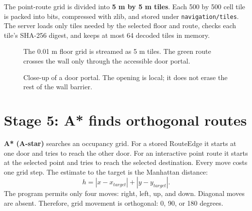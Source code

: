 \documentclass[11pt,a4paper]{article}
\newcommand{\term}[1]{\textbf{#1}}
\newcommand{\code}[1]{\texttt{#1}}
\newcommand{\door}[2]{\fill[green] (#1-0.16,#2-0.32) rectangle (#1+0.16,#2+0.32);}
\begin{document}
The point-route grid is divided into \term{5 m by 5 m tiles}. Each 500 by 500 cell tile is packed into bits, compressed with zlib, and stored under \code{navigation/tiles}. The server loads only tiles needed by the selected floor and route, checks each tile's SHA-256 digest, and keeps at most 64 decoded tiles in memory.

\begin{figure}[H]\centering
{}
\caption{The 0.01 m floor grid is streamed as 5 m tiles. The green route crosses the wall only through the accessible door portal.}
\end{figure}

\begin{figure}[H]\centering
{}
\caption{Close-up of a door portal. The opening is local; it does not erase the rest of the wall barrier.}
\end{figure}

\section{Stage 5: A* finds orthogonal routes}
\term{A* (A-star)} searches an occupancy grid. For a stored RouteEdge it starts at one door and tries to reach the other door. For an interactive point route it starts at the selected point and tries to reach the selected destination. Every move costs one grid step. The estimate to the target is the Manhattan distance:
\[
 h = |x-x_{target}| + |y-y_{target}|.
\]
The program permits only four moves: right, left, up, and down. Diagonal moves are absent. Therefore, grid movement is orthogonal: 0, 90, or 180 degrees.
\end{document}
